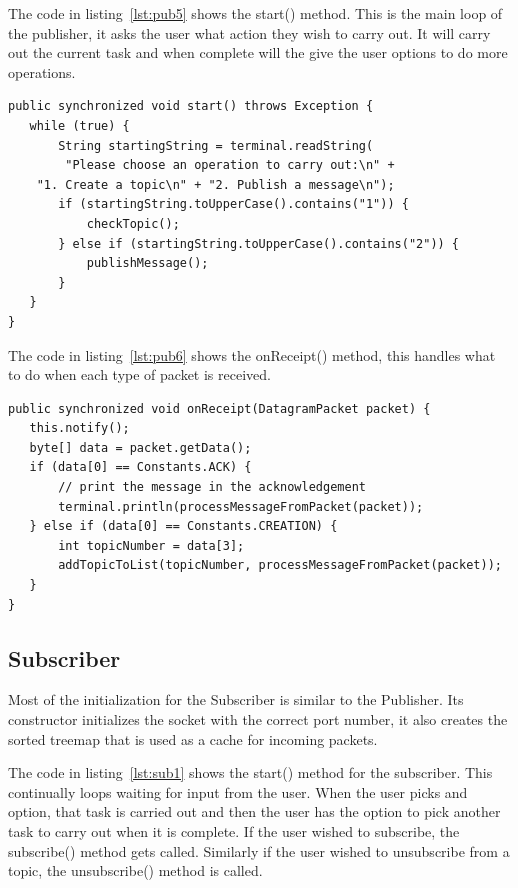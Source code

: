 \documentclass{article}
\begin{document}
The code in listing~\ref{lst:pub5} shows the start() method. This is the main loop of the publisher, it asks the user what action they wish to carry out. It will carry out the current task and when complete will the give the user options to do more operations.

\begin{lstlisting}[caption={[Sample Code 2]start() method of the publisher. Loops waiting for input}, label={lst:pub5}]
public synchronized void start() throws Exception {
   while (true) {
	   String startingString = terminal.readString(
		"Please choose an operation to carry out:\n" + 
	"1. Create a topic\n" + "2. Publish a message\n");
	   if (startingString.toUpperCase().contains("1")) {
		   checkTopic();
	   } else if (startingString.toUpperCase().contains("2")) {
		   publishMessage();
	   }
   }
}
\end{lstlisting}

The code in listing~\ref{lst:pub6} shows the onReceipt() method, this handles what to do when each type of packet is received.

\begin{lstlisting}[caption={[Sample Code 2]onReceipt() method, handles packets received on the publishers port}, label={lst:pub6}]
public synchronized void onReceipt(DatagramPacket packet) {
   this.notify();
   byte[] data = packet.getData();
   if (data[0] == Constants.ACK) {
	   // print the message in the acknowledgement
	   terminal.println(processMessageFromPacket(packet));
   } else if (data[0] == Constants.CREATION) {
	   int topicNumber = data[3];
	   addTopicToList(topicNumber, processMessageFromPacket(packet));
   }
}
\end{lstlisting}


\subsection{Subscriber}

Most of the initialization for the Subscriber is similar to the Publisher. Its constructor initializes the socket with the correct port number, it also creates the sorted treemap that is used as a cache for incoming packets.
\newline
\newline

The code in listing~\ref{lst:sub1} shows the start() method for the subscriber. This continually loops waiting for input from the user. When the user picks and option, 
that task is carried out and then the user has the option to pick another task to carry out when it is complete. If the user wished to subscribe, the subscribe() method gets called. Similarly if the user wished to unsubscribe from a topic, the unsubscribe() method is called. 
\end{document}
